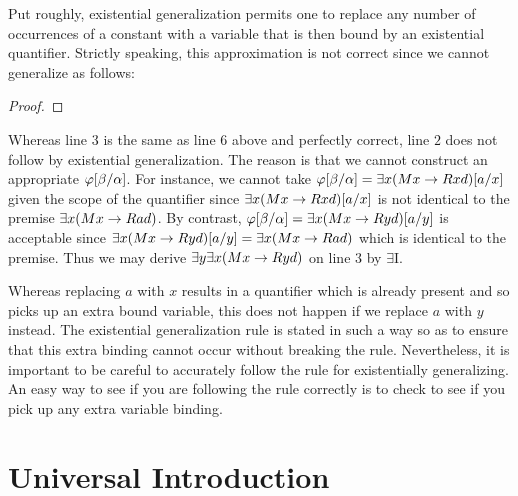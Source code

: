 Put roughly, existential generalization permits one to replace any number of occurrences of a constant with a variable that is then bound by an existential quantifier.
Strictly speaking, this approximation is not correct since we cannot generalize as follows:

\begin{proof}
	 \pr{}
   
	 
\end{proof}

Whereas line $3$ is the same as line $6$ above and perfectly correct, line $2$ does not follow by existential generalization.
The reason is that we cannot construct an appropriate $\varphi[\beta/\alpha]$.
For instance, we cannot take $\varphi[\beta/\alpha]=\exists x(Mx \rightarrow Rxd)[a/x]$ given the scope of the quantifier since $\exists x(Mx \rightarrow Rxd)[a/x]$ is not identical to the premise $\exists x(Mx \rightarrow Rad)$.
By contrast, $\varphi[\beta/\alpha]=\exists x(Mx \rightarrow Ryd)[a/y]$ is acceptable since $\exists x(Mx \rightarrow Ryd)[a/y]=\exists x(Mx \rightarrow Rad)$ which is identical to the premise.
Thus we may derive $\exists y\exists x(Mx \rightarrow Ryd)$ on line $3$ by $\exists$I.

Whereas replacing $a$ with $x$ results in a quantifier which is already present and so picks up an extra bound variable, this does not happen if we replace $a$ with $y$ instead. 
The existential generalization rule is stated in such a way so as to ensure that this extra binding cannot occur without breaking the rule.
Nevertheless, it is important to be careful to accurately follow the rule for existentially generalizing.
An easy way to see if you are following the rule correctly is to check to see if you pick up any extra variable binding.




\section{Universal Introduction}
  \label{sec:UniIntro}


